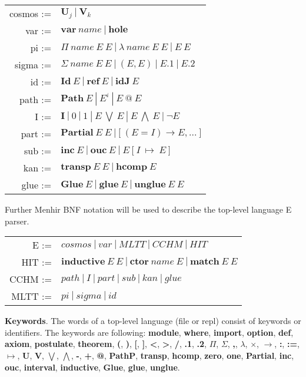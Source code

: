 \documentclass[a4paper,UKenglish,cleveref, autoref, thm-restate]{lipics-v2021}
\begin{document}
\begin{table}[ht]
\centering
\begin{tabular}{rl}
 cosmos :=&$\mathbf{U}_j \ |\ \mathbf{V}_k$ \\
    var :=&$\mathbf{var}\ name\ |\ \mathbf{hole}$ \\
     pi :=&$\Pi\ name\ E\ E\ |\ \lambda\ name\ E\ E\ |\ E\ E$ \\
  sigma :=&$\Sigma\ name\ E\ E\ |\ (E,E)\ |\ E.1\ |\ E.2$ \\
     id :=&$\mathbf{Id}\ E\ |\ \mathbf{ref}\ E\ |\ \mathbf{idJ}\ E$ \\
   path :=&$\mathbf{Path}\ E\ |\ E^i\ |\ E\ @\ E$ \\
      I :=&$\mathbf{I}\ |\ 0\ |\ 1\ |\ E\ \bigvee\ E\ |\ E\ \bigwedge\ E\ |\ \neg E$ \\
   part :=&$\mathbf{Partial}\ E\ E\ |\ \mathbf{[}\ (E=I) \rightarrow E, ...\ \mathbf{]}$ \\
    sub :=&$\mathbf{inc}\ E\ |\ \mathbf{ouc}\ E\ |\ E\ \mathbf{[}\ I\ \mapsto\ E\ \mathbf{]}$ \\
    kan :=&$\mathbf{transp}\ E\ E\ |\ \mathbf{hcomp}\ E$ \\
   glue :=&$\mathbf{Glue}\ E\ |\ \mathbf{glue}\ E\ |\ \mathbf{unglue}\ E\ E$ \\
\end{tabular}
\end{table}

Further Menhir BNF notation will be used to describe the top-level language E parser.

\begin{table}[ht]
\centering
\begin{tabular}{rl}
      E :=&$cosmos\ |\ var\ |\ MLTT\ |\ CCHM\ |\ HIT$ \\
    HIT :=&$\mathbf{inductive}\ E\ E\ |\ \mathbf{ctor}\ name\ E\ |\ \mathbf{match}\ E\ E$ \\
   CCHM :=&$path\ |\ I\ |\ part\ |\ sub\ |\ kan\ |\ glue$ \\
   MLTT :=&$pi\ |\ sigma\ |\ id$ \\
\end{tabular}
\end{table}


\textbf{Keywords}. The words of a top-level language (file or repl) consist of keywords or identifiers.
The keywords are following: \textbf{module}, \textbf{where}, \textbf{import}, \textbf{option}, \textbf{def}, \textbf{axiom},
\textbf{postulate}, \textbf{theorem}, \textbf{(}, \textbf{)}, \textbf{[}, \textbf{]}, \textbf{<}, \textbf{>},
\textbf{/}, \textbf{.1}, \textbf{.2}, \textbf{$\Pi$}, \textbf{$\Sigma$}, \textbf{,}, \textbf{$\lambda$}, \textbf{$\times$}, \textbf{$\rightarrow$}, \textbf{:}, \textbf{:=},
\textbf{$\mapsto$}, \textbf{U}, \textbf{V}, \textbf{$\bigvee$}, \textbf{$\bigwedge$}, \textbf{-}, \textbf{+}, \textbf{@}, \textbf{PathP},
\textbf{transp}, \textbf{hcomp}, \textbf{zero}, \textbf{one}, \textbf{Partial}, \textbf{inc},
\textbf{ouc}, \textbf{interval}, \textbf{inductive}, \textbf{Glue}, \textbf{glue}, \textbf{unglue}.\\
\end{document}
